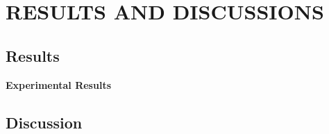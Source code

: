 \chapter{RESULTS AND DISCUSSIONS} \vspace{-15 mm} \hrulefill 
\label{Chapter:4}


\section{Results}

\noindent \textbf{Experimental Results}

\section{Discussion}

